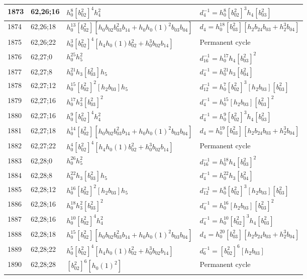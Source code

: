 \documentclass{article}
\begin{document}
\begin{longtable}{|l|l|>{\raggedright\arraybackslash}p{6cm}|>{\raggedright\arraybackslash}p{6cm}|}
1873 & 62,26;16 & $h_0^8[b_{02}^2]^4h_4^2$ & $d_{4}^{-1}=h_0^8[b_{02}^2]^3h_4[b_{03}^2]$\\
\hline
1874 & 62,26;18 & $h_0^{13}[b_{02}^2][h_0b_{02}b_{03}^2b_{14} + h_0h_0(1)^2b_{03}b_{04}]$ &$d_{4}=h_0^{18}[b_{03}^2][h_2b_{24}b_{03} + h_2^3b_{04}]$\\
\hline
1875 & 62,26;22 & $h_0^3[b_{02}^2]^4[h_4h_0(1)b_{02}^2 + h_0^3b_{02}b_{14}]$ & Permanent cycle\\
\hline
1876 & 62,27;0 & $h_0^{25}h_5^2$ & $d_{16}^{-1}=h_0^{17}h_4[b_{03}^2]^2$\\
\hline
1877 & 62,27;8 & $h_0^{21}h_3[b_{03}^2]h_5$ & $d_{4}^{-1}=h_0^{21}h_3[b_{04}^2]$\\
\hline
1878 & 62,27;12 & $h_0^{15}[b_{02}^2]^2[h_2b_{03}]h_5$ & $d_{12}^{-1}=h_0^7[b_{02}^2]^3[h_2b_{03}][b_{03}^2]$\\
\hline
1879 & 62,27;16 & $h_0^{17}h_3^2[b_{03}^2]^2$ & $d_{4}^{-1}=h_0^{15}[h_2b_{03}][b_{03}^2]^2$\\
1880 & 62,27;16 & $h_0^9[b_{02}^2]^4h_4^2$ & $d_{4}^{-1}=h_0^9[b_{02}^2]^3h_4[b_{03}^2]$\\
\hline
1881 & 62,27;18 & $h_0^{14}[b_{02}^2][h_0b_{02}b_{03}^2b_{14} + h_0h_0(1)^2b_{03}b_{04}]$ &$d_{4}=h_0^{19}[b_{03}^2][h_2b_{24}b_{03} + h_2^3b_{04}]$\\
\hline
1882 & 62,27;22 & $h_0^4[b_{02}^2]^4[h_4h_0(1)b_{02}^2 + h_0^3b_{02}b_{14}]$ & Permanent cycle\\
\hline
1883 & 62,28;0 & $h_0^{26}h_5^2$ & $d_{16}^{-1}=h_0^{18}h_4[b_{03}^2]^2$\\
\hline
1884 & 62,28;8 & $h_0^{22}h_3[b_{03}^2]h_5$ & $d_{4}^{-1}=h_0^{22}h_3[b_{04}^2]$\\
\hline
1885 & 62,28;12 & $h_0^{16}[b_{02}^2]^2[h_2b_{03}]h_5$ & $d_{12}^{-1}=h_0^8[b_{02}^2]^3[h_2b_{03}][b_{03}^2]$\\
\hline
1886 & 62,28;16 & $h_0^{18}h_3^2[b_{03}^2]^2$ & $d_{4}^{-1}=h_0^{16}[h_2b_{03}][b_{03}^2]^2$\\
1887 & 62,28;16 & $h_0^{10}[b_{02}^2]^4h_4^2$ & $d_{4}^{-1}=h_0^{10}[b_{02}^2]^3h_4[b_{03}^2]$\\
\hline
1888 & 62,28;18 & $h_0^{15}[b_{02}^2][h_0b_{02}b_{03}^2b_{14} + h_0h_0(1)^2b_{03}b_{04}]$ &$d_{4}=h_0^{20}[b_{03}^2][h_2b_{24}b_{03} + h_2^3b_{04}]$\\
\hline
1889 & 62,28;22 & $h_0^5[b_{02}^2]^4[h_4h_0(1)b_{02}^2 + h_0^3b_{02}b_{14}]$ & $d_{6}^{-1}=[b_{02}^2]^6[h_2b_{03}]$\\
\hline
1890 & 62,28;28 & $[b_{02}^2]^6[h_0(1)^2]$ & Permanent cycle\\

\end{longtable}
\end{document}
